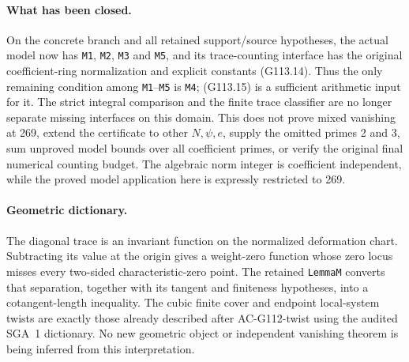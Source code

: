 \paragraph{What has been closed.}
On the concrete branch and all retained support/source hypotheses,
the actual model now has \texttt{M1}, \texttt{M2}, \texttt{M3}
and \texttt{M5}, and its trace-counting interface has the original
coefficient-ring normalization and explicit constants (G113.14).
Thus the only remaining condition among \texttt{M1}--\texttt{M5}
is \texttt{M4}; (G113.15) is a sufficient arithmetic input for it.
The strict integral comparison and the finite trace classifier
are no longer separate missing interfaces on this domain.
This does not prove mixed vanishing at 269, extend the certificate
to other \(N,\psi,e\), supply the omitted primes 2 and 3, sum
unproved model bounds over all coefficient primes, or verify the
original final numerical counting budget.  The algebraic norm
integer is coefficient independent, while the proved model
application here is expressly restricted to 269.

\paragraph{Geometric dictionary.}
The diagonal trace is an invariant function on the normalized
deformation chart.  Subtracting its value at the origin gives a
weight-zero function whose zero locus misses every two-sided
characteristic-zero point.  The retained \texttt{LemmaM} converts
that separation, together with its tangent and finiteness
hypotheses, into a cotangent-length inequality.  The cubic finite
cover and endpoint local-system twists are exactly those already
described after AC-G112-twist using the audited SGA~1 dictionary.
No new geometric object or independent vanishing theorem is being
inferred from this interpretation.
